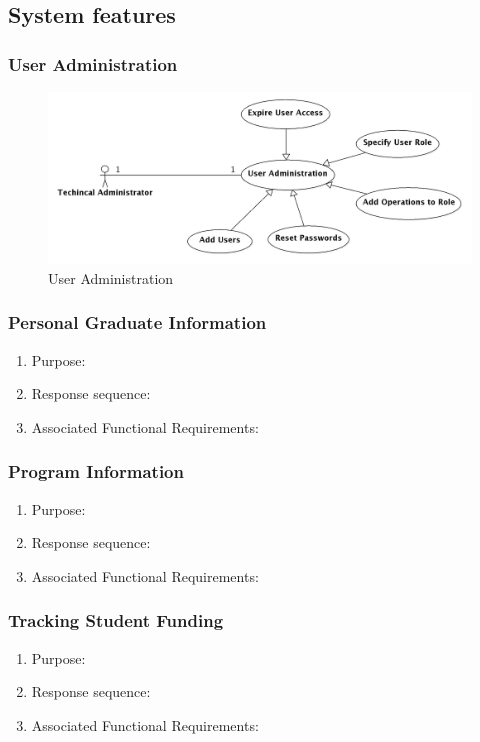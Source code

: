 \documentclass{journal}
\begin{document}
\subsection{System features}
\subsubsection{User Administration}

\begin{figure}[!h]
\begin{center}
\includegraphics[width=440px]{diagrams/use_cases/TechAdmin_uc.png} \caption{ User Administration } \label{fig:UsersAdmin}

\end{center}
\end{figure}




\subsubsection{Personal Graduate Information}
\begin{enumerate}
\item Purpose:
\item Response sequence:
\item Associated Functional Requirements:
\end{enumerate}

\subsubsection{Program Information}
\begin{enumerate}
\item Purpose:
\item Response sequence:
\item Associated Functional Requirements:
\end{enumerate}


\subsubsection{Tracking Student Funding}
\begin{enumerate}
\item Purpose:
\item Response sequence:
\item Associated Functional Requirements:
\end{enumerate}
\end{document}

